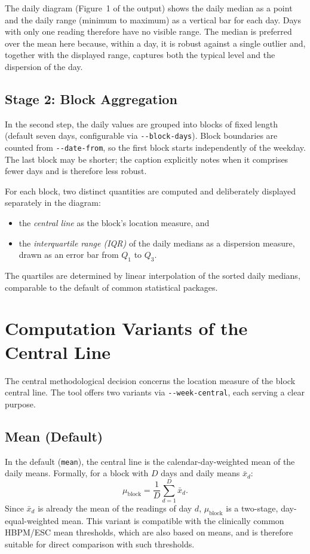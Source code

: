 \documentclass[conference]{IEEEtran}
\newcommand{\param}[1]{\texttt{#1}}
\begin{document}
The daily diagram (Figure~1 of the output) shows the daily median as a point and
the daily range (minimum to maximum) as a vertical bar for each day. Days with
only one reading therefore have no visible range. The median is preferred over
the mean here because, within a day, it is robust against a single outlier and,
together with the displayed range, captures both the typical level and the
dispersion of the day.

\subsection{Stage 2: Block Aggregation}
In the second step, the daily values are grouped into blocks of fixed length
(default seven days, configurable via \param{-{}-block-days}). Block boundaries
are counted from \param{-{}-date-from}, so the first block starts independently
of the weekday. The last block may be shorter; the caption explicitly notes when
it comprises fewer days and is therefore less robust.

For each block, two distinct quantities are computed and deliberately displayed
separately in the diagram:
\begin{itemize}
\item the \emph{central line} as the block's location measure, and
\item the \emph{interquartile range (IQR)} of the daily medians as a dispersion
measure, drawn as an error bar from $Q_1$ to $Q_3$.
\end{itemize}
The quartiles are determined by linear interpolation of the sorted daily
medians, comparable to the default of common statistical packages.

\section{Computation Variants of the Central Line}
The central methodological decision concerns the location measure of the block
central line. The tool offers two variants via \param{-{}-week-central}, each
serving a clear purpose.

\subsection{Mean (Default)}
In the default (\texttt{mean}), the central line is the calendar-day-weighted
mean of the daily means. Formally, for a block with $D$ days and daily means
$\bar{x}_d$:
\begin{equation}
\mu_{\mathrm{block}} = \frac{1}{D}\sum_{d=1}^{D} \bar{x}_d .
\end{equation}
Since $\bar{x}_d$ is already the mean of the readings of day $d$,
$\mu_{\mathrm{block}}$ is a two-stage, day-equal-weighted mean. This variant is
compatible with the clinically common HBPM/ESC mean thresholds, which are also
based on means, and is therefore suitable for direct comparison with such
thresholds.
\end{document}
